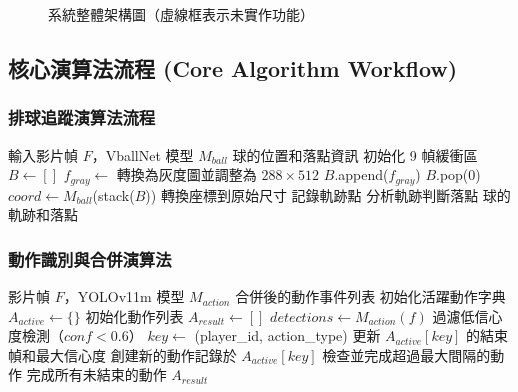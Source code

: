 \documentclass[a4paper,14pt,oneside]{article}
\begin{document}
\begin{figure}[H]
    \caption{系統整體架構圖（虛線框表示未實作功能）}
    \label{fig:system_architecture}
\end{figure}

\subsection{核心演算法流程 (Core Algorithm Workflow)}

\subsubsection{排球追蹤演算法流程}

\begin{algorithm}[H]
\caption{排球追蹤演算法}
\begin{algorithmic}[1]
\Require 輸入影片幀 $F$，VballNet 模型 $M_{ball}$
\Ensure 球的位置和落點資訊
\State 初始化 9 幀緩衝區 $B \gets []$
    \State $f_{gray} \gets$ 轉換為灰度圖並調整為 $288 \times 512$
    \State $B$.append($f_{gray}$)
        \State $B$.pop(0)
    \EndIf
    \State $coord \gets M_{ball}$(stack($B$))
    \State 轉換座標到原始尺寸
    \State 記錄軌跡點
\EndFor
\State 分析軌跡判斷落點
\State \Return 球的軌跡和落點
\end{algorithmic}
\end{algorithm}

\subsubsection{動作識別與合併演算法}

\begin{algorithm}[H]
\caption{動作識別與合併}
\begin{algorithmic}[1]
\Require 影片幀 $F$，YOLOv11m 模型 $M_{action}$
\Ensure 合併後的動作事件列表
\State 初始化活躍動作字典 $A_{active} \gets \{\}$
\State 初始化動作列表 $A_{result} \gets []$
    \State $detections \gets M_{action}(f)$
    \State 過濾低信心度檢測（$conf < 0.6$）
        \State $key \gets$ (player\_id, action\_type)
            \State 更新 $A_{active}[key]$ 的結束幀和最大信心度
        \Else
            \State 創建新的動作記錄於 $A_{active}[key]$
        \EndIf
    \EndFor
    \State 檢查並完成超過最大間隔的動作
\EndFor
\State 完成所有未結束的動作
\State \Return $A_{result}$
\end{algorithmic}
\end{algorithm}
\end{document}
